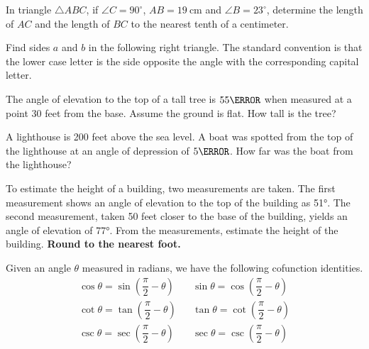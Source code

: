 \begin{example}
  In triangle $\triangle ABC$, if \(\angle C = 90^{\circ}\), \(AB = 19\ \text{cm}\) and \(\angle B = 23^{\circ}\), determine the length of $AC$ and the length of $BC$ to the nearest tenth of a centimeter.
\end{example}

\newpage

\begin{example}
  Find sides $a$ and $b$ in the following right triangle. The standard convention is that the lower case letter is the side opposite the angle with the corresponding capital letter.\\
\end{example}


\begin{example}
  The angle of elevation to the top of a tall tree is $55\degree$ when measured at a point 30 feet from the base. Assume the ground is flat. How tall is the tree?
\end{example}


\begin{example}
  A lighthouse is 200 feet above the sea level. A boat was spotted from the top of the lighthouse at an angle of depression of $5\degree$. How far was the boat from the lighthouse?
\end{example}


\newpage

\begin{example}
  To estimate the height of a building, two measurements are taken. The first measurement shows an angle of elevation to the top of the building as \ang{51}. The second measurement, taken 50 feet closer to the base of the building, yields an angle of elevation of \ang{77}. From the measurements, estimate the height of the building. \textbf{Round to the nearest foot.}
\end{example}

\begin{theorem}
Given an angle $\theta$ measured in radians, we have the following cofunction identities.
  \[
  \begin{array}{ccc}
    \cos\theta= \sin\left(\dfrac{\pi}{2}-\theta\right) & & \sin\theta= \cos\left(\dfrac{\pi}{2}-\theta\right)\\[0.5em]
    \cot\theta= \tan\left(\dfrac{\pi}{2}-\theta\right) & & \tan\theta= \cot\left(\dfrac{\pi}{2}-\theta\right)\\[0.5em]
    \csc\theta= \sec\left(\dfrac{\pi}{2}-\theta\right) & & \sec\theta= \csc\left(\dfrac{\pi}{2}-\theta\right)
  \end{array}
  \]
\end{theorem}

